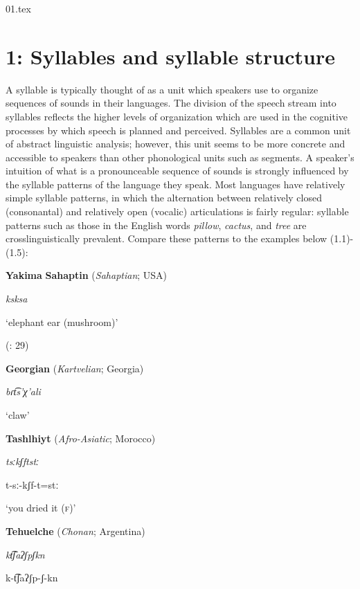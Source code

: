 01.tex
\chapter{1: Syllables and syllable structure}

  A syllable is typically thought of as a unit which speakers use to organize sequences of sounds in their languages. The division of the speech stream into syllables reflects the higher levels of organization which are used in the cognitive processes by which speech is planned and perceived. Syllables are a common unit of abstract linguistic analysis; however, this unit seems to be more concrete and accessible to speakers than other phonological units such as segments. A speaker’s intuition of what is a pronounceable sequence of sounds is strongly influenced by the syllable patterns of the language they speak. Most languages have relatively simple syllable patterns, in which the alternation between relatively closed (consonantal) and relatively open (vocalic) articulations is fairly regular: syllable patterns such as those in the English words \textit{pillow}, \textit{cactus}, and \textit{tree} are crosslinguistically prevalent. Compare these patterns to the examples below (1.1)-(1.5):

\ea\label{ex:(1.1)}
   \textbf{Yakima} \textbf{Sahaptin} (\textit{Sahaptian}; USA)

\textit{ksksa}

‘elephant ear (mushroom)’

(\citealt{HargusBeavert2006}: 29)
\z

\ea\label{ex:(1.2)}
   \textbf{Georgian} (\textit{Kartvelian}; Georgia)

\textit{bɾt͡s’χ’ali}

‘claw’

\citep[204]{Butskhrikidze2002}

\z

\ea\label{ex:(1.3)}
   \textbf{Tashlhiyt} (\textit{Afro-Asiatic}; Morocco)

\textit{tsːkʃftstː}

t{}-sː{}-kʃf{}-t=stː

‘you dried it (\textsc{f})’

\citep[332]{Ridouane2008}

\z

\ea\label{ex:(1.4)}
   \textbf{Tehuelche} (\textit{Chonan}; Argentina)

\textit{kt͡ʃaʔʃpʃkn}

k{}-t͡ʃaʔʃp{}-ʃ{}-kn

